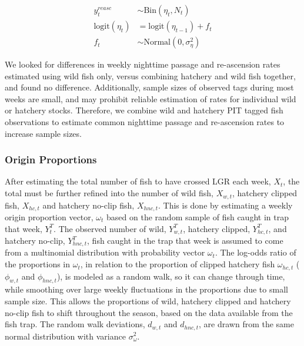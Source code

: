 \documentclass[
  12pt,
]{article}
\begin{document}
\begin{equation}
  \begin{aligned}
    y^{reasc}_t &\sim \text{Bin} \left(\eta_t, N_t \right) \\
    \text{logit} \left( \eta_{t} \right) &= \text{logit} \left(\eta_{t-1} \right) + f_t \\
    f_t &\sim \text{Normal}(0, \sigma^2_\eta)
  \end{aligned}
\end{equation}

We looked for differences in weekly nighttime passage and re-ascension rates estimated using wild fish only, versus combining hatchery and wild fish together, and found no difference. Additionally, sample sizes of observed tags during most weeks are small, and may prohibit reliable estimation of rates for individual wild or hatchery stocks. Therefore, we combine wild and hatchery PIT tagged fish observations to estimate common nighttime passage and re-ascension rates to increase sample sizes.

\hypertarget{origin-proportions}{%
\subsubsection{Origin Proportions}\label{origin-proportions}}

After estimating the total number of fish to have crossed LGR each week, \(X_t\), the total must be further refined into the number of wild fish, \(X_{w,t}\), hatchery clipped fish, \(X_{hc,t}\) and hatchery no-clip fish, \(X_{hnc, t}\). This is done by estimating a weekly origin proportion vector, \(\omega_t\) based on the random sample of fish caught in trap that week, \(Y^T_t\). The observed number of wild, \(Y^T_{w,t}\), hatchery clipped, \(Y^T_{hc,t}\), and hatchery no-clip, \(Y^T_{hnc,t}\), fish caught in the trap that week is assumed to come from a multinomial distribution with probability vector \(\omega_t\). The log-odds ratio of the proportions in \(\omega_t\), in relation to the proportion of clipped hatchery fish \(\omega_{hc,t}\) (\(\phi_{w,t}\) and \(\phi_{hnc,t}\)), is modeled as a random walk, so it can change through time, while smoothing over large weekly fluctuations in the proportions due to small sample size. This allows the proportions of wild, hatchery clipped and hatchery no-clip fish to shift throughout the season, based on the data available from the fish trap. The random walk deviations, \(d_{w,t}\) and \(d_{hnc,t}\), are drawn from the same normal distribution with variance \(\sigma^2_\omega\).
\end{document}
